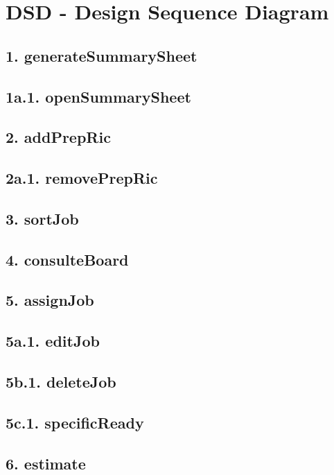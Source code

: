 \chapter{DSD - Design Sequence Diagram}

\section*{1. generateSummarySheet}

\section*{1a.1. openSummarySheet}

\section*{2. addPrepRic}

\section*{2a.1. removePrepRic}

\section*{3. sortJob}

\section*{4. consulteBoard}

\section*{5. assignJob}

\section*{5a.1. editJob}

\section*{5b.1. deleteJob}

\section*{5c.1. specificReady}

\section*{6. estimate}
